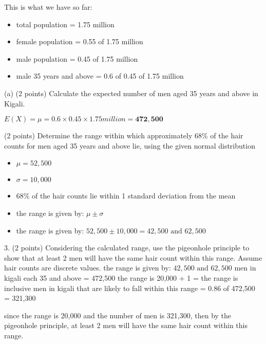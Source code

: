 \documentclass{article}
\begin{document}
This is what we have so far:

\begin{itemize}
    \item total population = 1.75 million
    \item female population = 0.55 of 1.75 million
    \item male population = 0.45 of 1.75 million
    \item male 35 years and above = 0.6 of 0.45 of 1.75 million
\end{itemize}


(a) (2 points) Calculate the expected number of men aged 35 years and above in Kigali.

\(E(X) = \mu = 0.6 \times 0.45 \times 1.75 million = \mathbf{472,500}\) \newline

(2 points) Determine the range within which approximately 68\% of the hair counts for men aged 35 years and above lie, using the given normal distribution

\begin{itemize}
    \item \(\mu = 52,500\)
    \item \(\sigma = 10,000\)
    \item 68\% of the hair counts lie within 1 standard deviation from the mean
    \item the range is given by: \(\mu \pm \sigma\)
    \item the range is given by: \(52,500 \pm 10,000 = 42,500 \text{ and } 62,500\)
\end{itemize}

3. (2 points) Considering the calculated range, use the pigeonhole principle to show that at
least 2 men will have the same hair count within this range. Assume hair counts are discrete
values.\newline\newline
the range is given by: \(42,500 \text{ and } 62,500\)\newline
men in kigali each 35 and above = 472,500\newline
the range is 20,000 + 1 = the range is inclusive\newline
men in kigali that are likely to fall within this range = 0.86 of 472,500 = 321,300\newline

since the range is 20,000 and the number of men is 321,300, then by the pigeonhole principle, at least 2 men will have the same hair count within this range.\newline
\end{document}
